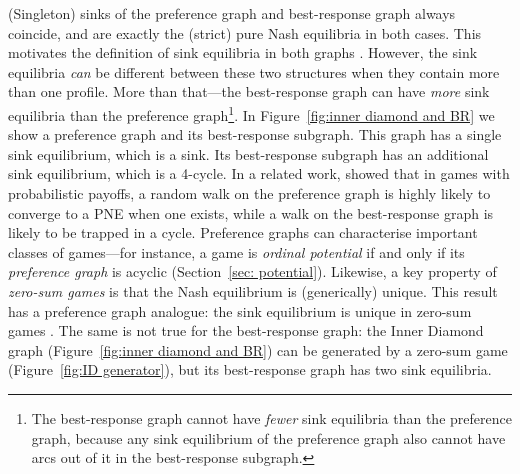 \documentclass[preprint,authoryear]{elsarticle}
\begin{document}
(Singleton) sinks of the preference graph and best-response graph always coincide, and are exactly the (strict) pure Nash equilibria in both cases. This motivates the definition of sink equilibria in both graphs \citep{goemans_sink_2005}. However, the sink equilibria \emph{can} be different between these two structures when they contain more than one profile. More than that---the best-response graph can have \emph{more} sink equilibria than the preference graph\footnote{The best-response graph cannot have \emph{fewer} sink equilibria than the preference graph, because any sink equilibrium of the preference graph also cannot have arcs out of it in the best-response subgraph.}. In Figure~\ref{fig:inner diamond and BR} we show a preference graph \citep[the Inner Diamond graph,][]{biggar_graph_2023} and its best-response subgraph. This graph has a single sink equilibrium, which is a sink. Its best-response subgraph has an additional sink equilibrium, which is a 4-cycle. In a related work, \cite{amiet_when_2021} showed that in games with probabilistic payoffs, a random walk on the preference graph is highly likely to converge to a PNE when one exists, while a walk on the best-response graph is likely to be trapped in a cycle. Preference graphs can characterise important classes of games---for instance, a game is \emph{ordinal potential} \citep{monderer_fictitious_1996} if and only if its \emph{preference graph} is acyclic (Section~\ref{sec: potential}). Likewise, a key property of \emph{zero-sum games} is that the Nash equilibrium is (generically) unique. This result has a preference graph analogue: the sink equilibrium is unique in zero-sum games \citep{biggar_graph_2023}. The same is not true for the best-response graph: the Inner Diamond graph (Figure~\ref{fig:inner diamond and BR}) can be generated by a zero-sum game (Figure~\ref{fig:ID generator}), but its best-response graph has two sink equilibria.
\end{document}
